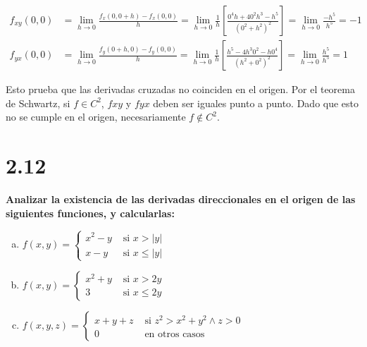\documentclass{article}
\begin{document}
\begin{subequations}
\begin{align}
f_{xy}(0,0) &= \lim_{h \rightarrow 0} \frac{f_x(0, 0+h) - f_x(0,0)}{h} = \lim_{h \rightarrow 0} \frac{1}{h} \left[ \frac{0^4 h + 4 0^2 h^3 - h^5}{(0^2 + h^2)^2} \right] = \lim_{h \rightarrow 0} \frac{-h^5}{h^5} = -1 \\
f_{yx}(0,0) &= \lim_{h \rightarrow 0} \frac{f_y(0+h, 0) - f_y(0,0)}{h} = \lim_{h \rightarrow 0} \frac{1}{h} \left[ \frac{h^5 - 4 h^3 0^2 - h 0^4}{(h^2 + 0^2)^2} \right] = \lim_{h \rightarrow 0} \frac{h^5}{h^5} = 1
\end{align}
\end{subequations}

Esto prueba que las derivadas cruzadas no coinciden en el origen. Por el teorema de Schwartz, si $f \in C^2$, $fxy$ y $fyx$ deben ser iguales punto a punto. Dado que esto no se cumple en el origen, necesariamente $f \notin C^2$.

\section*{2.12}
\label{sec:2.12}

\textbf{Analizar la existencia de las derivadas direccionales en el origen de las siguientes funciones, y calcularlas:}

\begin{enumerate}[(a)]
\bfseries

\item $f(x,y) = \left\{ \begin{array}{ll}
x^2 - y &\text{ si } x > |y| \\
x - y &\text{ si } x \leq |y|
\end{array} \right.$

\item $f(x,y) = \left\{ \begin{array}{ll}
x^2 + y &\text{ si } x > 2y \\
3 &\text{ si } x \leq 2y
\end{array} \right.$

\item $f(x,y,z) = \left\{ \begin{array}{ll}
x+y+z &\text{ si } z^2 > x^2 + y^2 \wedge z > 0 \\
0 &\text{ en otros casos }
\end{array} \right.$

\end{enumerate}
\end{document}
